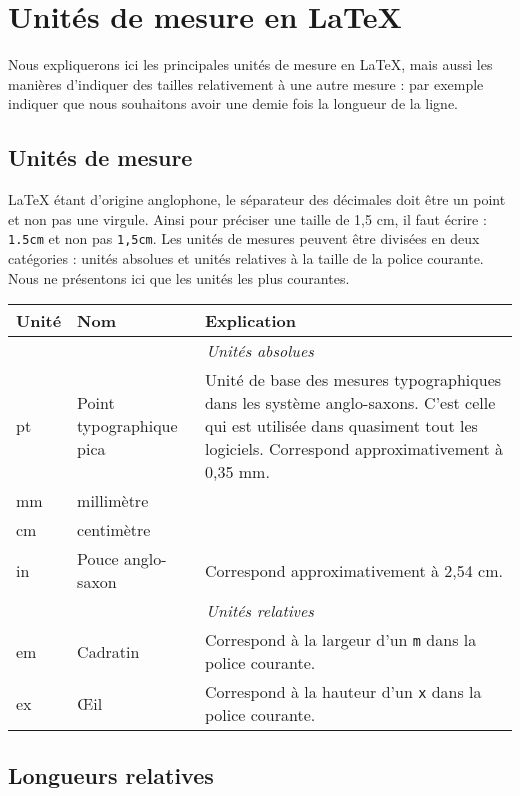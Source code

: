 \chapter{Unités de mesure en \LaTeX{}}\label{unite}

\begin{prealable}
	Nous expliquerons ici les principales unités de mesure en \LaTeX{}, mais aussi les manières d'indiquer des tailles relativement à une autre mesure : par exemple indiquer que nous souhaitons avoir une demie fois la longueur de la ligne.
\end{prealable}

\section{Unités de mesure}

\LaTeX{} étant d'origine anglophone, le séparateur des décimales doit être un point et non pas une virgule. Ainsi pour préciser une taille de 1,5 cm, il faut écrire : \verb|1.5cm| et non pas \verb|1,5cm|.
Les unités de mesures peuvent être divisées en deux catégories : unités absolues et unités relatives à la taille  de la police courante. Nous ne présentons ici que les unités les plus courantes.



\begin{longtable}{llp{15em}}
	Unité & Nom & Explication \\
	\endhead
	\multicolumn{3}{c}{\emph{Unités absolues}} \\
	pt & Point typographique pica & Unité de base des mesures typographiques dans les système anglo-saxons. C'est celle qui est utilisée dans quasiment tout les logiciels. Correspond approximativement à 0,35 mm. \\
	mm & millimètre &  \\
	cm  & centimètre & \\
	in    & Pouce anglo-saxon & Correspond approximativement à 2,54 cm. \\
	\multicolumn{3}{c}{\emph{Unités relatives}} \\
	em & Cadratin & Correspond à la largeur d'un \verb|m| dans la police courante. \\
	ex  & Œil & Correspond à la hauteur d'un \verb|x| dans la police courante. \\
\end{longtable}

\section{Longueurs relatives}

